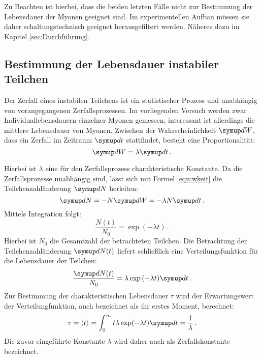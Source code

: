 Zu Beachten ist hierbei, dass die beiden letzten Fälle nicht zur Bestimmung der Lebensdauer der Myonen geeignet sind. Im experimentellen Aufbau müssen sie daher schaltungstechnisch geeignet herausgefiltert werden. Näheres dazu im Kapitel \ref{sec:Durchführung}.

\subsection{Bestimmung der Lebensdauer instabiler Teilchen}
Der Zerfall eines instabilen Teilchens ist ein statistischer Prozess und unabhängig von vorangegangenen Zerfallsprozessen.
Im vorliegenden Versuch werden zwar Individuallebensdauern einzelner Myonen gemessen, interessant ist allerdings die mittlere Lebensdauer von Myonen.
Zwischen der Wahrscheinlichkeit $\upd W$, dass ein Zerfall im Zeitraum $\upd t$ stattfindet, besteht eine Proportionalität:
\begin{equation}
  \label{eqn:wkeit}
  \upd W=\lambda\upd t\mathrm{\,.}
\end{equation}

Hierbei ist $\lambda$ eine für den Zerfallsprozess charakteristische Konstante.
Da die Zerfallsprozesse unabhängig sind, lässt sich mit Formel \ref{eqn:wkeit} die Teilchenzahländerung $\upd N$ herleiten:
\begin{equation*}
\upd N = -N \upd W = - \lambda N \upd t  \mathrm{\,.}
\end{equation*}
Mittels Integration folgt:
\begin{equation}
\frac{N(t)}{N_0} = \exp{(-\lambda t)}\mathrm{\,.}
\end{equation}
Hierbei ist $N_0$ die Gesamtzahl der betrachteten Teilchen.
Die Betrachtung der Teilchenzahländerung $\upd N(t)$ liefert schließlich eine Verteilungsfunktion für die Lebensdauer der Teilchen:
\begin{equation}
  \label{eqn:verteilung}
  \frac{\upd N(t)}{N_0} = \lambda \exp{(-\lambda t)}\upd t\mathrm{\,.}
\end{equation}
Zur Bestimmung der charakteristischen Lebensdauer $\tau$ wird der Erwartungswert der Verteilungfunktion, auch bezeichnet als ihr erstes Moment, berechnet:
\begin{equation}
  \tau=\Braket{t}=\int_0^\infty t\lambda\exp(-\lambda t)\upd t=\frac{1}{\lambda}\mathrm{\,.}
\end{equation}
Die zuvor eingeführte Konstante $\lambda$ wird daher auch als Zerfallskonstante bezeichnet.

